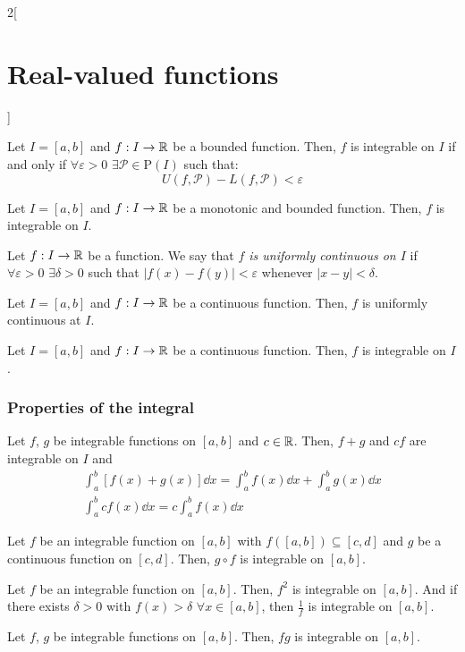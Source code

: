 \documentclass[../../../main.tex]{subfiles}
\begin{document}
\begin{multicols}{2}[\section{Real-valued functions}]
\begin{lemma}
    Let $I=[a,b]$ and $f:I\rightarrow\mathbb{R}$ be a bounded function. Then, $f$ is integrable on $I$ if and only if $\forall\varepsilon>0$ $\exists\mathcal{P}\in\mathrm{P}(I)$ such that: $$U(f,\mathcal{P})-L(f,\mathcal{P})<\varepsilon$$
\end{lemma}
\begin{theorem}
    Let $I=[a,b]$ and $f:I\rightarrow\mathbb{R}$ be a monotonic and bounded function. Then, $f$ is integrable on $I$.
\end{theorem}
\begin{definition}
    Let $f:I\rightarrow\mathbb{R}$ be a function. We say that \textit{$f$ is uniformly continuous on $I$} if $\forall\varepsilon>0$ $\exists\delta>0$ such that $|f(x)-f(y)|<\varepsilon$ whenever $|x-y|<\delta$.
\end{definition}
\begin{theorem}
    Let $I=[a,b]$ and $f:I\rightarrow\mathbb{R}$ be a continuous function. Then, $f$ is uniformly continuous at $I$.
\end{theorem}
\begin{theorem}
    Let $I=[a,b]$ and $f:I\rightarrow\mathbb{R}$ be a continuous function. Then, $f$ is integrable on $I$.
\end{theorem}
\subsubsection*{Properties of the integral}
\begin{prop}
    Let $f$, $g$ be integrable functions on $[a,b]$ and $c\in\mathbb{R}$. Then, $f+g$ and $cf$ are integrable on $I$ and
    \begin{gather*}
        \int_a^b[f(x)+g(x)]\dd x=\int_a^bf(x)\dd x+\int_a^bg(x)\dd x\\ \int_a^bcf(x)\dd x=c\int_a^bf(x)\dd x
    \end{gather*}
\end{prop}
\begin{theorem}
    Let $f$ be an integrable function on $[a,b]$ with $f([a,b])\subseteq[c,d]$ and $g$ be a continuous function on $[c,d]$. Then, $g\circ f$ is integrable on $[a,b]$.
\end{theorem}
\begin{corollary}
    Let $f$ be an integrable function on $[a,b]$. Then, $f^2$ is integrable on $[a,b]$. And if there exists $\delta>0$ with $f(x)>\delta$ $\forall x\in [a,b]$, then $\frac{1}{f}$ is integrable on $[a,b]$.
\end{corollary}
\begin{corollary}
    Let $f$, $g$ be integrable functions on $[a,b]$. Then, $fg$ is integrable on $[a,b]$.
\end{corollary}

\end{multicols}
\end{document}
